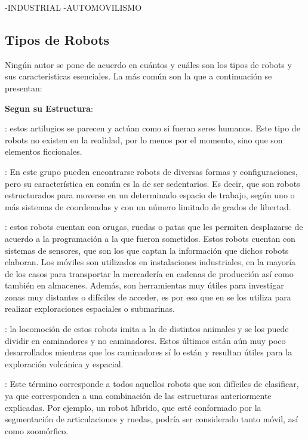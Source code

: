 -INDUSTRIAL
-AUTOMOVILISMO

\subsection{Tipos de Robots}
\label{subsec:tipos de robots}

Ningún autor se pone de acuerdo en cuántos y cuáles son los tipos de robots y sus características esenciales. La más común son la que a continuación se presentan:

\textbf{Segun su Estructura}:
\begin{description}[align=left]
\item [Androides]: estos artilugios se parecen y actúan como si fueran seres humanos. Este tipo de robots no existen en la realidad, por lo menos por el momento, sino que son elementos ficcionales.

\item [Poliarticulados]: En este grupo pueden encontrarse robots de diversas formas y configuraciones, pero su característica en común es la de ser sedentarios. Es decir, que son robots estructurados para moverse en un determinado espacio de trabajo, según uno o más sistemas de coordenadas y con un número limitado de grados de libertad.

\item [Móviles]: estos robots cuentan con orugas, ruedas o patas que les permiten desplazarse de acuerdo a la programación a la que fueron sometidos. Estos robots cuentan con sistemas de sensores, que son los que captan la información que dichos robots elaboran. Los móviles son utilizados en instalaciones industriales, en la mayoría de los casos para transportar la mercadería en cadenas de producción así como también en almacenes. Además, son herramientas muy útiles para investigar zonas muy distantes o difíciles de acceder, es por eso que en se los utiliza para realizar exploraciones espaciales o submarinas.

\item [Zoomórficos]: la locomoción de estos robots imita a la de distintos animales y se los puede dividir en caminadores y no caminadores. Estos últimos están aún muy poco desarrollados mientras que los caminadores sí lo están y resultan útiles para la exploración volcánica y espacial.

\item [Híbridos]: Este término corresponde a todos aquellos robots que son difíciles de clasificar, ya que corresponden a una combinación de las estructuras anteriormente explicadas. Por ejemplo, un robot híbrido, que esté conformado por la segmentación de articulaciones y ruedas, podría ser considerado tanto móvil, así como zoomórfico.
\end{description}

